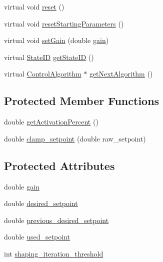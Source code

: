 \begin{DoxyCompactItemize}
virtual void \hyperlink{classControlAlgorithm_a9e64d8fb3fb40414adef533a0914c8fc}{reset} ()
\item 
virtual void \hyperlink{classControlAlgorithm_a694627bbf7d01f2c7f62d83e672b9231}{reset\+Starting\+Parameters} ()
\item 
virtual void \hyperlink{classControlAlgorithm_ad4cee63394f06ffa2227ece3579b9b05}{set\+Gain} (double \hyperlink{classControlAlgorithm_a2ac40220b20a6bf9f1ee0665138467a5}{gain})
\item 
virtual \hyperlink{States_8hpp_a26aafbeccd8f356b39e1809f1ab9cfdc}{State\+ID} \hyperlink{classControlAlgorithm_a68ec2395b0ea38776d38e219b16dc827}{get\+State\+ID} ()
\item 
virtual \hyperlink{classControlAlgorithm}{Control\+Algorithm} $\ast$ \hyperlink{classControlAlgorithm_acc910803a006526921450cfd66467d2e}{get\+Next\+Algorithm} ()
\end{DoxyCompactItemize}
\subsection*{Protected Member Functions}
\begin{DoxyCompactItemize}
\item 
double \hyperlink{classControlAlgorithm_a5433d86e863ff01f0fc990a955afb893}{get\+Activation\+Percent} ()
\item 
double \hyperlink{classControlAlgorithm_a7cf1dc233469cac50bec27020ca3ddf3}{clamp\+\_\+setpoint} (double raw\+\_\+setpoint)
\end{DoxyCompactItemize}
\subsection*{Protected Attributes}
\begin{DoxyCompactItemize}
\item 
double \hyperlink{classControlAlgorithm_a2ac40220b20a6bf9f1ee0665138467a5}{gain}
\item 
double \hyperlink{classControlAlgorithm_aabbb3a42a32c1996b22b0e15bdb4ff1b}{desired\+\_\+setpoint}
\item 
double \hyperlink{classControlAlgorithm_adc4574602d459aca5b9320937bc102b1}{previous\+\_\+desired\+\_\+setpoint}
\item 
double \hyperlink{classControlAlgorithm_a02ba55f15705474b47a0635b027a7b44}{used\+\_\+setpoint}
\item 
int \hyperlink{classControlAlgorithm_ac1a0dc23fe7d2cac2301de1d7e95c357}{shaping\+\_\+iteration\+\_\+threshold}
\end{DoxyCompactItemize}


